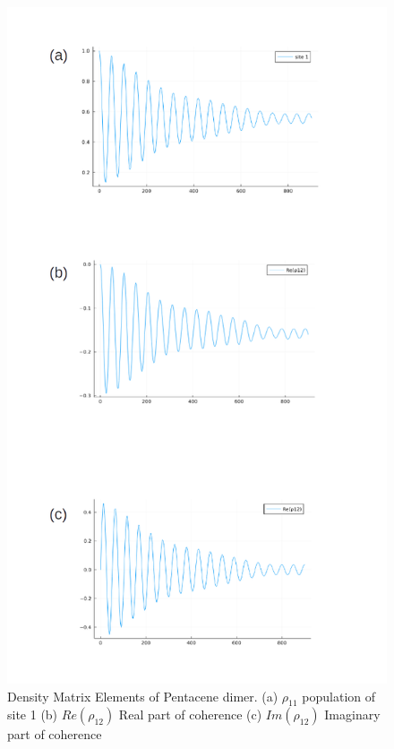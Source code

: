 \begin{figure}
\centering
\includegraphics[scale=0.4]{Figures/pentacene_result}
\caption{Density Matrix Elements of Pentacene dimer. (a) $\rho_{11}$ population of site 1 (b) $Re(\rho_{12})$ Real part of coherence (c) $Im(\rho_{12})$ Imaginary part of coherence}
\end{figure}




